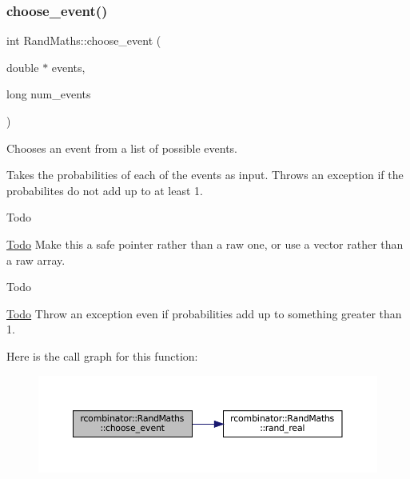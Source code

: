 \subsubsection{\texorpdfstring{choose\+\_\+event()}{choose\_event()}}
{\footnotesize\ttfamily int Rand\+Maths\+::choose\+\_\+event (\begin{DoxyParamCaption}\item[{double $\ast$}]{events,  }\item[{long}]{num\+\_\+events }\end{DoxyParamCaption})}



Chooses an event from a list of possible events. 

Takes the probabilities of each of the events as input. Throws an exception if the probabilites do not add up to at least 1.

\begin{DoxyRefDesc}{Todo}
\item[\mbox{\hyperlink{todo__todo000001}{Todo}}]Make this a safe pointer rather than a raw one, or use a vector rather than a raw array.\end{DoxyRefDesc}


\begin{DoxyRefDesc}{Todo}
\item[\mbox{\hyperlink{todo__todo000002}{Todo}}]Throw an exception even if probabilities add up to something greater than 1. \end{DoxyRefDesc}
Here is the call graph for this function\+:\nopagebreak
\begin{figure}[H]
\begin{center}
\leavevmode
\includegraphics[width=350pt]{classrcombinator_1_1RandMaths_afbc0d35bd9744ecab1983914ac32d68c_cgraph}
\end{center}
\end{figure}
\mbox{\label{classrcombinator_1_1RandMaths_aa96396651fba75ffb972b5fa1c2994c7}} 
